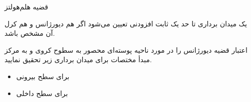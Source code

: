 \begin{ELunit}


\end{ELunit}

\begin{ELtheorem}{قضیه هلم‌هولتز}

یک میدان برداری تا حد یک ثابت افزودنی تعیین می‌شود اگر هم دیورژانس و هم کرل آن مشخص باشد.

\end{ELtheorem}


\begin{ELexample}{}

اعتبار قضیه دیورژانس را در مورد ناحیه پوسته‌ای محصور به سطوح کروی  و   به مرکز مبدأ مختصات برای میدان برداری زیر تحقیق نمایید.


\begin{ELsolution}


\begin{itemize}
\tightlist
\item
  برای سطح بیرونی
\end{itemize}


\begin{itemize}
\tightlist
\item
  برای سطح داخلی
\end{itemize}



\end{ELsolution}

\end{ELexample}

